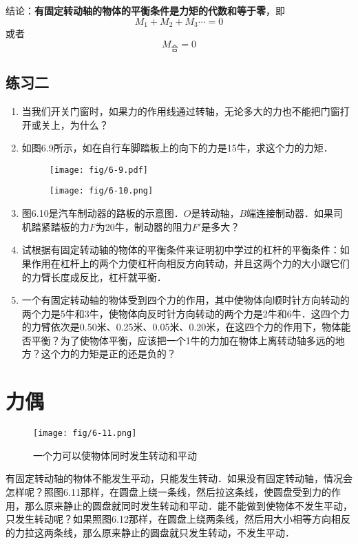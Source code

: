 结论：\textbf{有固定转动轴的物体的平衡条件是力矩的代数和等于零}，即
\[M_1+M_2+M_3\cdots=0 \]
或者
\[M_{\text{合}}=0\]

\subsection*{练习二}

\begin{enumerate}
    \item 当我们开关门窗时，如果力的作用线通过转轴，无论多大的力也不能把门窗打开或关上，为什么？
    \item 如图6.9所示，如在自行车脚踏板上的向下的力是15牛，求这个力的力矩．
    
   \begin{figure}[htp]\centering
   	\begin{minipage}[t]{0.48\textwidth}
   		\centering
   		\texttt{[image: fig/6-9.pdf]}
   		\caption{}
   	\end{minipage}
   	\begin{minipage}[t]{0.48\textwidth}
   		\centering
   		\texttt{[image: fig/6-10.png]}
   		\caption{}
   	\end{minipage}
   \end{figure}

    \item 图6.10是汽车制动器的路板的示意图．$O$是转动轴，$B$端连接制动器．如果司机踏紧踏板的力$F$为20牛，制动器的阻力$F'$是多大？
    \item 试根据有固定转动轴的物体的平衡条件来证明初中学过的杠杆的平衡条件：如果作用在杠杆上的两个力使杠杆向相反方向转动，并且这两个力的大小跟它们的力臂长度成反比，杠杆就平衡．
    \item 一个有固定转动轴的物体受到四个力的作用，其中使物体向顺时针方向转动的两个力是5牛和3牛，使物体向反时针方向转动的两个力是2牛和6牛．这四个力的力臂依次是0.50米、0.25米、0.05米、0.20米，在这四个力的作用下，物体能否平衡？为了使物体平衡，应该把一个1牛的力加在物体上离转动轴多远的地方？这个力的力矩是正的还是负的？
\end{enumerate}


\section{力偶}
\begin{figure}[htp]
\centering\texttt{[image: fig/6-11.png]}
\caption{一个力可以使物体同时发生转动和平动}
\end{figure}
有固定转动轴的物体不能发生平动，只能发生转动．如果没有固定转动轴，情况会怎样呢？照图6.11那样，在圆盘上绕一条线，然后拉这条线，使圆盘受到力的作用，那么原来静止的圆盘就同时发生转动和平动．能不能做到使物体不发生平动，只发生转动呢？如果照图6.12那样，在圆盘上绕两条线，然后用大小相等方向相反的力拉这两条线，那么原来静止的圆盘就只发生转动，不发生平动．

